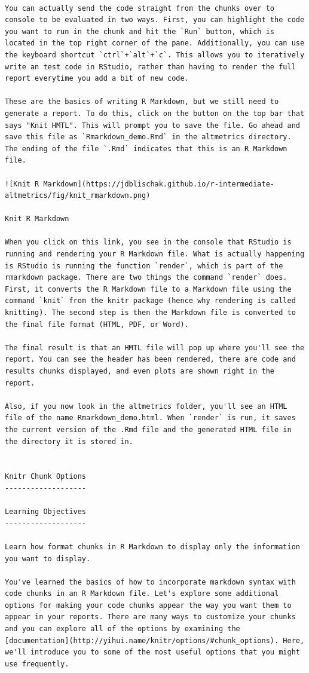 \documentclass[
]{book}
\begin{document}
\begin{verbatim}

You can actually send the code straight from the chunks over to console to be evaluated in two ways. First, you can highlight the code you want to run in the chunk and hit the `Run` button, which is located in the top right corner of the pane. Additionally, you can use the keyboard shortcut `ctrl`+`alt`+`c`. This allows you to iteratively write an test code in RStudio, rather than having to render the full report everytime you add a bit of new code.

These are the basics of writing R Markdown, but we still need to generate a report. To do this, click on the button on the top bar that says "Knit HMTL". This will prompt you to save the file. Go ahead and save this file as `Rmarkdown_demo.Rmd` in the altmetrics directory. The ending of the file `.Rmd` indicates that this is an R Markdown file.

![Knit R Markdown](https://jdblischak.github.io/r-intermediate-altmetrics/fig/knit_rmarkdown.png)

Knit R Markdown

When you click on this link, you see in the console that RStudio is running and rendering your R Markdown file. What is actually happening is RStudio is running the function `render`, which is part of the rmarkdown package. There are two things the command `render` does. First, it converts the R Markdown file to a Markdown file using the command `knit` from the knitr package (hence why rendering is called knitting). The second step is then the Markdown file is converted to the final file format (HTML, PDF, or Word).

The final result is that an HMTL file will pop up where you'll see the report. You can see the header has been rendered, there are code and results chunks displayed, and even plots are shown right in the report.

Also, if you now look in the altmetrics folder, you'll see an HTML file of the name Rmarkdown_demo.html. When `render` is run, it saves the current version of the .Rmd file and the generated HTML file in the directory it is stored in.


Knitr Chunk Options
-------------------

Learning Objectives
-------------------

Learn how format chunks in R Markdown to display only the information you want to display.

You've learned the basics of how to incorporate markdown syntax with code chunks in an R Markdown file. Let's explore some additional options for making your code chunks appear the way you want them to appear in your reports. There are many ways to customize your chunks and you can explore all of the options by examining the [documentation](http://yihui.name/knitr/options/#chunk_options). Here, we'll introduce you to some of the most useful options that you might use frequently.


\end{verbatim}
\end{document}
